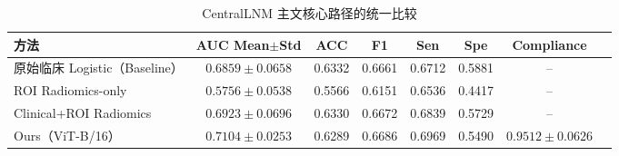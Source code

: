 \begin{table}[H]
\centering
\caption{CentralLNM 主文核心路径的统一比较}
\label{tab:main_route_comparison}
\footnotesize
\setlength{\tabcolsep}{4pt}
\begin{tabular}{lccccccc}
\toprule
方法 & AUC Mean$\pm$Std & ACC & F1 & Sen & Spe & Compliance \\
\midrule
原始临床 Logistic（Baseline） & $0.6859\pm0.0658$ & 0.6332 & 0.6661 & 0.6712 & 0.5881 & -- \\
ROI Radiomics-only & $0.5756\pm0.0538$ & 0.5566 & 0.6151 & 0.6536 & 0.4417 & -- \\
Clinical+ROI Radiomics & $0.6923\pm0.0696$ & 0.6330 & 0.6672 & 0.6839 & 0.5729 & -- \\
Ours（ViT-B/16） & $\mathbf{0.7104\pm0.0253}$ & 0.6289 & 0.6686 & 0.6969 & 0.5490 & $0.9512\pm0.0626$ \\
\bottomrule
\end{tabular}
\end{table}
